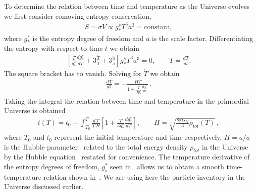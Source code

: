 {\color{black} To determine the relation between time and temperature as the Universe evolves we first  consider} comoving entropy conservation, 
\begin{align}
S=\sigma V\propto g^s_\ast T^3a^3=\mathrm{constant},
\end{align}
where $g^s_\ast$ is the entropy degree of freedom and $a$ is the scale factor. Differentiating the entropy with respect to time $t$ we obtain
\begin{align}
\left[\frac{\dot{T}}{g^s_\ast}\frac{dg^s_\ast}{dT}+3\frac{\dot{T}}{T}+3\frac{\dot{a}}{a}\right]g^s_\ast T^3a^3=0,\qquad \dot{T}=\frac{dT}{dt}.
\end{align}
The square bracket has to vanish. Solving for $\dot T $ we obtain
\begin{align}
\frac{dT}{dt}=-\frac{HT}{1+\frac{T}{3g^s_\ast}\frac{d\,g^s_\ast}{dT}}\,.
\end{align}
Taking the integral the relation between time and temperature in the primordial Universe is obtained
\begin{align}\label{time}
t(T)=t_0-\int^T_{T_0} \frac{d\,T }{T\,H}\left[1+\frac{T}{3g^s_\ast}\frac{dg^s_\ast}{dT}\right],\qquad H=\sqrt{\frac{8\pi G_N}{3}\rho_{tot}(T)}
\,,
\end{align}
where $T_0$ and $t_0$ represent the initial temperature and time respectively. $H=\dot a/a$ is the Hubble parameter~ related to the total energy density $\rho_{tot}$ in the Universe by the Hubble equation~ restated for convenience. The temperature derivative of the entropy degrees of freedom, $g^\ast_s$ seen in~ allows us to obtain a smooth time-temperature relation shown in~. We are using here the particle inventory in the Universe discussed earlier.

